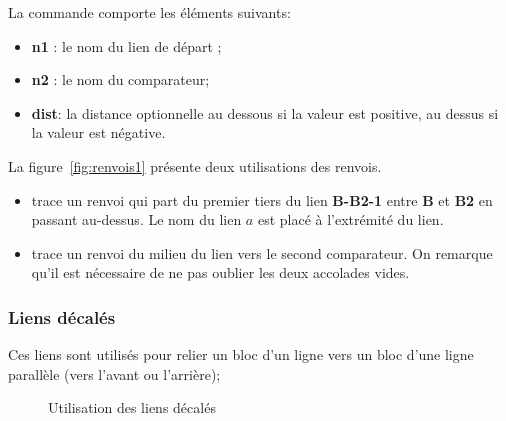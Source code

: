 \documentclass[a4paper,11pt]{article}                      %
\begin{document}
La commande  comporte les éléments suivants:
\begin{itemize}
\item \textbf{n1} : le nom du lien de départ ;
\item \textbf{n2} : le nom du comparateur;
\item \textbf{dist}: la distance optionnelle  au dessous si la valeur est positive, au dessus si la valeur est négative.

\end{itemize}

La figure~\ref{fig:renvois1}  présente deux utilisations des renvois.





\begin{itemize}
\item {}  trace un renvoi qui part du premier tiers du lien \textbf{B-B2-1}  entre \textbf{B} et \textbf{B2} en passant au-dessus. Le nom du lien $a$  est placé à l'extrémité du lien.
\item {} trace un renvoi du milieu du lien vers le second comparateur. On remarque qu'il est nécessaire de ne pas oublier les deux accolades vides.
\end{itemize}


\subsubsection{Liens décalés}
Ces liens sont utilisés pour relier un bloc d'un ligne vers un bloc d'une ligne parallèle (vers l'avant ou l'arrière);

\begin{figure}[!htb]
\centering
\begin{tikzexampleL}[title=,]

\end{tikzexampleL}

\caption{Utilisation des liens décalés}
\label{fig:liensdecals}
\end{figure}
\end{document}
